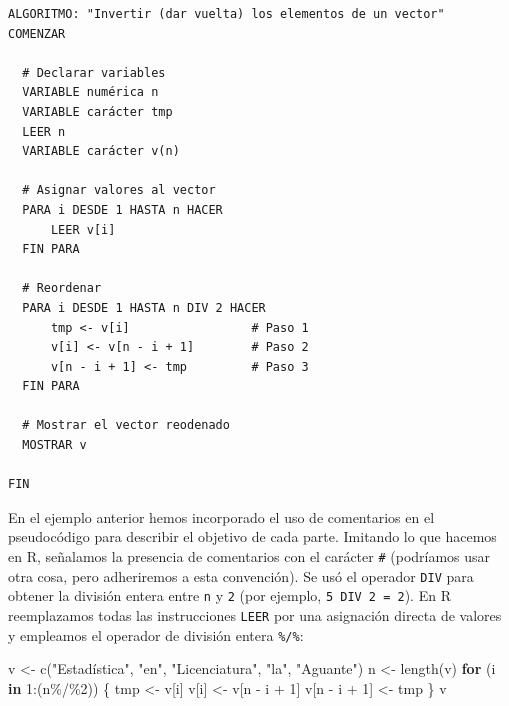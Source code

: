 \documentclass[
]{book}
\newenvironment{Shaded}{\begin{snugshade}}{\end{snugshade}}
\newcommand{\ControlFlowTok}[1]{\textcolor[rgb]{0.13,0.29,0.53}{\textbf{#1}}}
\newcommand{\DecValTok}[1]{\textcolor[rgb]{0.00,0.00,0.81}{#1}}
\newcommand{\FunctionTok}[1]{\textcolor[rgb]{0.00,0.00,0.00}{#1}}
\newcommand{\NormalTok}[1]{#1}
\newcommand{\OtherTok}[1]{\textcolor[rgb]{0.56,0.35,0.01}{#1}}
\newcommand{\SpecialCharTok}[1]{\textcolor[rgb]{0.00,0.00,0.00}{#1}}
\newcommand{\StringTok}[1]{\textcolor[rgb]{0.31,0.60,0.02}{#1}}
\begin{document}
\begin{verbatim}
ALGORITMO: "Invertir (dar vuelta) los elementos de un vector"
COMENZAR
    
  # Declarar variables
  VARIABLE numérica n
  VARIABLE carácter tmp
  LEER n
  VARIABLE carácter v(n)
  
  # Asignar valores al vector
  PARA i DESDE 1 HASTA n HACER
      LEER v[i]
  FIN PARA
  
  # Reordenar
  PARA i DESDE 1 HASTA n DIV 2 HACER
      tmp <- v[i]                 # Paso 1
      v[i] <- v[n - i + 1]        # Paso 2
      v[n - i + 1] <- tmp         # Paso 3
  FIN PARA
  
  # Mostrar el vector reodenado
  MOSTRAR v
    
FIN
\end{verbatim}

En el ejemplo anterior hemos incorporado el uso de comentarios en el pseudocódigo para describir el objetivo de cada parte. Imitando lo que hacemos en R, señalamos la presencia de comentarios con el carácter \texttt{\#} (podríamos usar otra cosa, pero adheriremos a esta convención). Se usó el operador \texttt{DIV} para obtener la división entera entre \texttt{n} y \texttt{2} (por ejemplo, \texttt{5\ DIV\ 2\ =\ 2}). En R reemplazamos todas las instrucciones \texttt{LEER} por una asignación directa de valores y empleamos el operador de división entera \texttt{\%/\%}:

\begin{Shaded}
\begin{Highlighting}[]
\NormalTok{v }\OtherTok{\textless{}{-}} \FunctionTok{c}\NormalTok{(}\StringTok{"Estadística"}\NormalTok{, }\StringTok{"en"}\NormalTok{, }\StringTok{"Licenciatura"}\NormalTok{, }\StringTok{"la"}\NormalTok{, }\StringTok{"Aguante"}\NormalTok{)}
\NormalTok{n }\OtherTok{\textless{}{-}} \FunctionTok{length}\NormalTok{(v)}
\ControlFlowTok{for}\NormalTok{ (i }\ControlFlowTok{in} \DecValTok{1}\SpecialCharTok{:}\NormalTok{(n}\SpecialCharTok{\%/\%}\DecValTok{2}\NormalTok{)) \{}
\NormalTok{    tmp }\OtherTok{\textless{}{-}}\NormalTok{ v[i]}
\NormalTok{    v[i] }\OtherTok{\textless{}{-}}\NormalTok{ v[n }\SpecialCharTok{{-}}\NormalTok{ i }\SpecialCharTok{+} \DecValTok{1}\NormalTok{]}
\NormalTok{    v[n }\SpecialCharTok{{-}}\NormalTok{ i }\SpecialCharTok{+} \DecValTok{1}\NormalTok{] }\OtherTok{\textless{}{-}}\NormalTok{ tmp}
\NormalTok{\}}
\NormalTok{v}
\end{Highlighting}
\end{Shaded}
\end{document}

